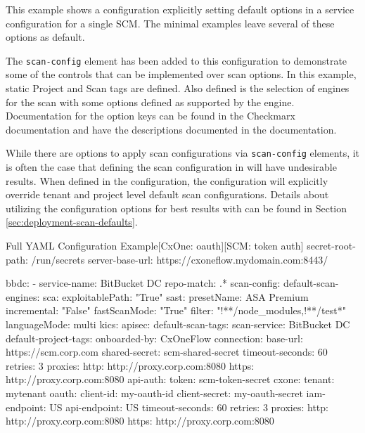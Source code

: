 This example shows a \cxoneflow configuration explicitly setting default options in a service 
configuration for a single SCM.  The minimal examples leave several of these options as default.

The \texttt{scan-config} element has been added to this configuration to
demonstrate some of the controls that can be implemented over scan options.  In this
example, static Project and Scan tags are defined.  Also defined is the selection
of engines for the scan with some options defined as supported by the engine.
Documentation for the option keys can be found in the Checkmarx
documentation and have the descriptions documented in the
documentation.

While there are options to apply scan configurations via \texttt{scan-config} elements, it is often the case that defining the scan configuration
in \cxoneflow will have undesirable results.  When defined in the \cxoneflow configuration, the configuration will explicitly override \cxone
tenant and project level default scan configurations.  Details about utilizing the \cxone configuration options for best results with \cxoneflow
can be found in Section \ref{sec:deployment-scan-defaults}.

\begin{code}{Full YAML Configuration Example}{[CxOne: oauth]}{[SCM: token auth]}
secret-root-path: /run/secrets
server-base-url: https://cxoneflow.mydomain.com:8443/

bbdc:
    - service-name: BitBucket DC
      repo-match: .*
      scan-config:
          default-scan-engines:
              sca:
                  exploitablePath: "True"
              sast:
                  presetName: ASA Premium
                  incremental: "False"
                  fastScanMode: "True"
                  filter: "!**/node_modules,!**/test*"
                  languageMode: multi
              kics:
              apisec:
          default-scan-tags:
              scan-service: BitBucket DC
          default-project-tags:
              onboarded-by: CxOneFlow
      connection:
          base-url: https://scm.corp.com
          shared-secret: scm-shared-secret
          timeout-seconds: 60
          retries: 3
          proxies:
            http: http://proxy.corp.com:8080
            https: http://proxy.corp.com:8080
          api-auth:
              token: scm-token-secret
      cxone:
          tenant: mytenant
          oauth:
              client-id: my-oauth-id
              client-secret: my-oauth-secret
          iam-endpoint: US
          api-endpoint: US
          timeout-seconds: 60
          retries: 3
          proxies:
            http: http://proxy.corp.com:8080
            https: http://proxy.corp.com:8080
\end{code}


